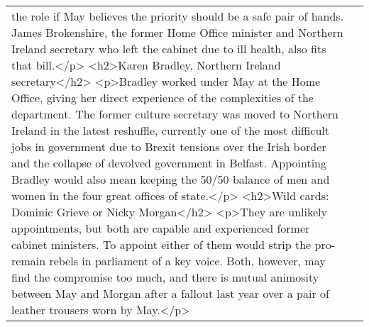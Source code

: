 \documentclass[]{article}
\begin{document}
\begin{table}[!h]
{\begin{tabular}[t]{ll}
the role if May believes the priority should be a safe pair of hands. James Brokenshire, the former Home Office minister and Northern Ireland secretary who left the cabinet due to ill health, also fits that bill.</p> <h2>Karen Bradley, Northern Ireland secretary</h2> <p>Bradley worked under May at the Home Office, giving her direct experience of the complexities of the department. The former culture secretary was moved to Northern Ireland in the latest reshuffle, currently one of the most difficult jobs in government due to Brexit tensions over the Irish border and the collapse of devolved government in Belfast. Appointing Bradley would also mean keeping the 50/50 balance of men and women in the four great offices of state.</p> <h2>Wild cards: Dominic Grieve or Nicky Morgan</h2> <p>They are unlikely appointments, but both are capable and experienced former cabinet ministers. To appoint either of them would strip the pro-remain rebels in parliament of a key voice. Both, however, may find the compromise too much, and there is mutual animosity between May and Morgan after a fallout last year over a pair of leather trousers worn by May.</p>\\

\end{tabular}}
\end{table}
\end{document}
